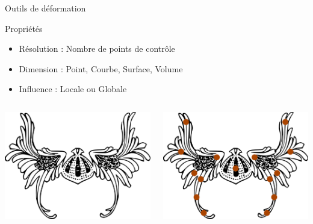 \documentclass[xcolor=x11names,compress]{beamer}
\renewcommand{\(}{\begin{columns}} \renewcommand{\)}{\end{columns}}
\newcommand{\<}[1]{\begin{column}{#1}} \renewcommand{\>}{\end{column}}
\begin{document}
\begin{frame}{Outils de déformation}
  \begin{exampleblock}{Propriétés}
    \begin{itemize}
      \item Résolution : Nombre de points de contrôle
      \item Dimension : Point, Courbe, Surface, Volume
      \item Influence : Locale ou Globale
    \end{itemize}
  \end{exampleblock}
\begin{columns}[t]
  \begin{column}{0.5\textwidth}
  \centering
    \includegraphics[scale=0.1]{Outil-Mono-Sans}
  \end{column}
  \pause
  \begin{column}{0.5\textwidth}
  \centering
    \includegraphics[scale=0.1]{Outil-Mono-Points}

\end{column}
\end{columns}
\end{frame}
\end{document}

